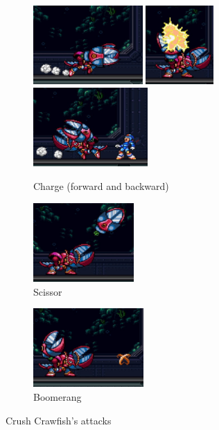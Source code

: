 \begin{figure}[htp]	\centering
	\begin{subfigure}{\linewidth}
		\centering
		\includegraphics[height=3cm]{figures/X3/Crush_crawfish/crush_dash.jpg}
		\includegraphics[height=3cm]{figures/X3/Crush_crawfish/crush_dash_1.jpg}
		\includegraphics[height=3cm]{figures/X3/Crush_crawfish/crush_dash_2.jpg}
		\caption{Charge (forward and backward)}
	\end{subfigure}
	\begin{subfigure}{.4\linewidth}
		\centering
		\includegraphics[height=3cm]{figures/X3/Crush_crawfish/crush_fire.jpg}
		\caption{Scissor}
	\end{subfigure}
	\begin{subfigure}{.4\linewidth}
		\centering
		\includegraphics[height=3cm]{figures/X3/Crush_crawfish/crush_boomerang.jpg}
		\caption{Boomerang}
	\end{subfigure}	
	\caption{Crush Crawfish's attacks}
\end{figure}

